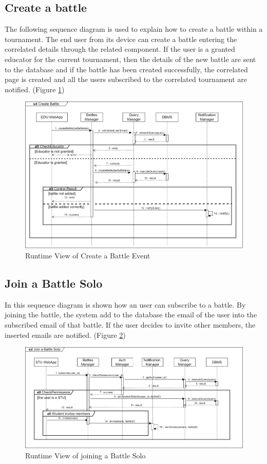 \subsection{Create a battle}
The following sequence diagram is used to explain how to create a battle within a tournament. The end user from its device can create a battle entering the correlated details through the related component. If the user is a granted educator for the current tournament, then the details of the new battle are sent to the database and if the battle has been created successfully, the correlated page is created and all the users subscribed to the correlated tournament are notified. (Figure \ref{fig:RuntimeView_CreateBattle})
\begin{figure}[H]
    \centering
    \includegraphics[width=\textwidth]{images/runtimeviews/RuntimeView_CreateBattle.png}
    \caption{Runtime View of Create a Battle Event}
    \label{fig:RuntimeView_CreateBattle}
\end{figure}

\newpage
\subsection{Join a Battle Solo}
In this sequence diagram is shown how an user can subscribe to a battle. By joining the battle, the system add to the database the email of the user into the subscribed email of that battle. If the user decides to invite other members, the inserted emails are notified. (Figure \ref{fig:RuntimeView_JoinBattleSolo})
\begin{figure}[H]
    \centering
    \includegraphics[width=\textwidth]{images/runtimeviews/RuntimeView_JoinBattleSolo.png}
    \caption{Runtime View of joining a Battle Solo}
    \label{fig:RuntimeView_JoinBattleSolo}
\end{figure}

